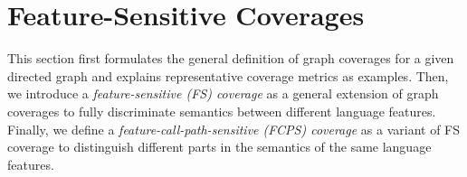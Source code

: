 \section{Feature-Sensitive Coverages}\label{sec:fscov}

This section first formulates the general definition of graph coverages for a
given directed graph and explains representative coverage metrics as examples.
%
Then, we introduce a \textit{feature-sensitive (FS) coverage} as a general
extension of graph coverages to fully discriminate semantics between different
language features.
%
Finally, we define a \textit{feature-call-path-sensitive (FCPS) coverage} as a
variant of FS coverage to distinguish different parts in the semantics of the
same language features.




